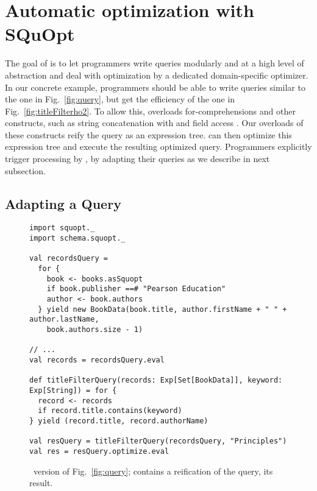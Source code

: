 \chapter{Automatic optimization with SQuOpt}

\label{ch:aosd13-solution}
\label{sec:solution}
The goal of {\LoS} is to let programmers write queries modularly and at a high level of abstraction and deal with optimization by a dedicated domain-specific optimizer. In our concrete example,
programmers should be able to write queries similar to the one in Fig.~\ref{fig:query}, but get the efficiency of the one in Fig.~\ref{fig:titleFilterho2}.
To allow this, {\LoS} overloads for-comprehensions and other constructs, such as string concatenation with \code{+} and field access . Our overloads of these constructs reify the query as an expression tree. {\LoS} can then optimize this expression tree and execute the resulting optimized query.
Programmers explicitly trigger processing by {\LoS}, by adapting their queries as we describe in next subsection.

\section{Adapting a Query}
\label{subsec:adaptingaquery}
\begin{figure}
\centering
\begin{lstlisting}
import squopt._
import schema.squopt._

val recordsQuery =
  for {
    book <- books.asSquopt
    if book.publisher ==# "Pearson Education"
    author <- book.authors
  } yield new BookData(book.title, author.firstName + " " + author.lastName,
    book.authors.size - 1)

// ...
val records = recordsQuery.eval

def titleFilterQuery(records: Exp[Set[BookData]], keyword: Exp[String]) = for {
  record <- records
  if record.title.contains(keyword)
} yield (record.title, record.authorName)

val resQuery = titleFilterQuery(recordsQuery, "Principles")
val res = resQuery.optimize.eval
\end{lstlisting}
\caption{\LoS\ version of Fig.~\ref{fig:query};  contains a reification of the query,  its result.}
\label{fig:reifiedQuery}
\end{figure}

